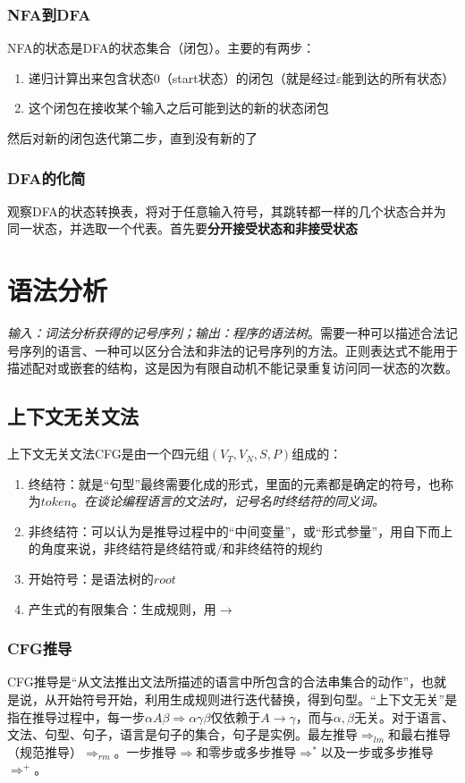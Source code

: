 \documentclass[]{report}
\begin{document}
		\subsection{NFA到DFA}
		NFA的状态是DFA的状态集合（闭包）。主要的有两步：
		\begin{enumerate}
			\item 递归计算出来包含状态0（start状态）的闭包（就是经过$\varepsilon$能到达的所有状态）
			\item 这个闭包在接收某个输入之后可能到达的新的状态闭包
		\end{enumerate}\par
		然后对新的闭包迭代第二步，直到没有新的了
		\subsection{DFA的化简}
		观察DFA的状态转换表，将对于任意输入符号，其跳转都一样的几个状态合并为同一状态，并选取一个代表。首先要\textbf{分开接受状态和非接受状态}


	\chapter{语法分析}
	\textit{输入：词法分析获得的记号序列；输出：程序的语法树}。需要一种可以描述合法记号序列的语言、一种可以区分合法和非法的记号序列的方法。正则表达式不能用于描述配对或嵌套的结构，这是因为有限自动机不能记录重复访问同一状态的次数。\par
	\section{上下文无关文法}
		上下文无关文法CFG是由一个四元组$(V_T,V_N,S,P)$组成的：
		\begin{enumerate}
			\item 终结符：就是“句型”最终需要化成的形式，里面的元素都是确定的符号，也称为$token$。\textit{在谈论编程语言的文法时，记号名时终结符的同义词。}
			\item 非终结符：可以认为是推导过程中的“中间变量”，或“形式参量”，用自下而上的角度来说，非终结符是终结符或/和非终结符的规约
			\item 开始符号：是语法树的$root$
			\item 产生式的有限集合：生成规则，用$\to$
		\end{enumerate}
		\subsection{CFG推导}
		CFG推导是“从文法推出文法所描述的语言中所包含的合法串集合的动作”，也就是说，从开始符号开始，利用生成规则进行迭代替换，得到句型。“上下文无关”是指在推导过程中，每一步$\alpha A\beta\Rightarrow\alpha\gamma\beta$仅依赖于$A\to\gamma$，而与$\alpha,\beta$无关。对于语言、文法、句型、句子，语言是句子的集合，句子是实例。最左推导$\Rightarrow_{lm}$和最右推导（规范推导）$\Rightarrow_{rm}$。一步推导$\Rightarrow$和零步或多步推导$\Rightarrow^*$以及一步或多步推导$\Rightarrow^+$。\par
\end{document}
